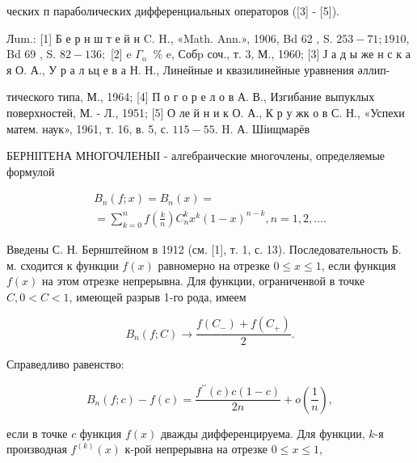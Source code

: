 \documentclass[10pt]{article}
\begin{document}
ческих п параболических дифференциальных операторов ([3] - [5]).



Лum.: [1] Б е р н ш т е й н C. H., «Math. Ann.», 1906, Bd 62 , S. $253-71 ; 1910$, Bd 69 , S. $82-136 ;$ [2] e $\Gamma_{\text {o }}$ \% e, Собp соч., т. 3, М., 1960; [3] Ј а д ы же н с к а я О. А., У р а л ьц е в а Н. Н., Линейные и квазилинейные уравнения әллип-

тического типа, М., 1964; [4] П о г о р е л о в А. В., Изгибание выпуклых поверхностей, М. - Л., 1951; [5] О ле й н и к О. А., К р у жк о в С. Н., «Успехи матем. наук», 1961, т. 16, в. 5, с. $115-55$. H. А. Шіищмарёв



БЕРНІІТЕНА МНОГОЧЛЕНЫІ - алгебраические многочлены, определяемые формулой



\[

\begin{gathered}

B_{n}(f ; x)=B_{n}(x)= \\

=\sum_{k=0}^{n} f\left(\frac{k}{n}\right) C_{n}^{k} x^{k}(1-x)^{n-k}, n=1,2, \ldots .

\end{gathered}

\]



Введены С. Н. Бернштейном в 1912 (см. [1], т. 1, с. 13). Последовательность Б. м. сходится к функции $f(x)$ равномерно на отрезке $0 \leqslant x \leqslant 1$, если функция $f(x)$ на этом отрезке непрерывна. Для функции, ограниченвой в точке $C, 0<C<1$, имеющей разрыв 1-го рода, имеем



\[

B_{n}(f ; C) \longrightarrow \frac{f\left(C_{-}\right)+f\left(C_{+}\right)}{2} .

\]



Справедливо равенство:



\[

B_{n}(f ; c)-f(c)=\frac{f^{\prime \prime}(c) c(1-c)}{2 n}+o\left(\frac{1}{n}\right),

\]



если в точке $c$ функция $f(x)$ дважды дифференцируема. Для функции, $k$-я производная $f^{(k)}(x)$ к-рой непрерывна на отрезке $0 \leqslant x \leqslant 1$,
\end{document}

